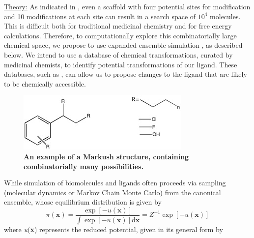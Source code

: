 \documentclass[12pt]{article}
\begin{document}
\underline{Theory:}  As indicated in , even a scaffold with four potential sites for modification and 10 modifications at each site can result in a search space of $10^4$ molecules. This is difficult both for traditional medicinal chemistry and for free energy calculations.  Therefore, to computationally explore this combinatorially large chemical space, we propose to use expanded ensemble simulation \cite{lyubartsev1992}, as described below.  We intend to use a database of chemical transformations, curated by medicinal chemists, to identify potential transformations of our ligand. These databases, such as \cite{chemtransform}, can allow us to propose changes to the ligand that are likely to be chemically accessible. 
\begin{figure}[H]
\centering
\includegraphics[scale=0.6]{cd_markush.jpg}
\caption{\textbf{An example of a Markush structure, containing combinatorially many possibilities.}}
\label{markfig}
\end{figure}
While simulation of biomolecules and ligands often proceeds via sampling (molecular dynamics or Markov Chain Monte Carlo) from the canonical ensemble, whose equilibrium distribution is given by \begin{equation} \pi(\textbf{x})=\frac{\exp[-u(\textbf{x})]}{\int \exp[-u(\textbf{x})] \mathrm{d}\textbf{x}}=Z^{-1}\exp[-u(\textbf{x})]\end{equation}
where \textit{u}(\textbf{x}) represents the reduced potential, given in its general form by
\end{document}
